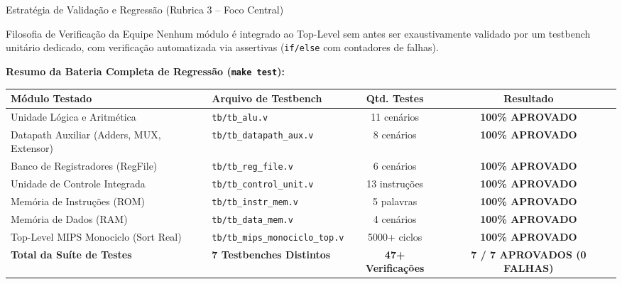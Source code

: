\documentclass[aspectratio=169, 11pt]{beamer}
\begin{document}
\begin{frame}{Estratégia de Validação e Regressão (Rubrica 3 -- Foco Central)}
  \begin{block}{Filosofia de Verificação da Equipe}
    Nenhum módulo é integrado ao Top-Level sem antes ser exaustivamente validado por um testbench unitário dedicado, com verificação automatizada via assertivas (\texttt{if/else} com contadores de falhas).
  \end{block}

  \vspace{0.3cm}
  \textbf{Resumo da Bateria Completa de Regressão (\texttt{make test}):}
  \vspace{0.2cm}
  \centering
  \small
  \begin{tabular}{llcc}
    \toprule
    \textbf{Módulo Testado} & \textbf{Arquivo de Testbench} & \textbf{Qtd. Testes} & \textbf{Resultado} \\
    \midrule
    Unidade Lógica e Aritmética & \texttt{tb/tb\_alu.v} & 11 cenários & \textcolor{passgreen}{\textbf{100\% APROVADO}} \\
    Datapath Auxiliar (Adders, MUX, Extensor) & \texttt{tb/tb\_datapath\_aux.v} & 8 cenários & \textcolor{passgreen}{\textbf{100\% APROVADO}} \\
    Banco de Registradores (RegFile) & \texttt{tb/tb\_reg\_file.v} & 6 cenários & \textcolor{passgreen}{\textbf{100\% APROVADO}} \\
    Unidade de Controle Integrada & \texttt{tb/tb\_control\_unit.v} & 13 instruções & \textcolor{passgreen}{\textbf{100\% APROVADO}} \\
    Memória de Instruções (ROM) & \texttt{tb/tb\_instr\_mem.v} & 5 palavras & \textcolor{passgreen}{\textbf{100\% APROVADO}} \\
    Memória de Dados (RAM) & \texttt{tb/tb\_data\_mem.v} & 4 cenários & \textcolor{passgreen}{\textbf{100\% APROVADO}} \\
    Top-Level MIPS Monociclo (Sort Real) & \texttt{tb/tb\_mips\_monociclo\_top.v} & 5000+ ciclos & \textcolor{passgreen}{\textbf{100\% APROVADO}} \\
    \midrule
    \textbf{Total da Suíte de Testes} & \textbf{7 Testbenches Distintos} & \textbf{47+ Verificações} & \textcolor{passgreen}{\textbf{7 / 7 APROVADOS (0 FALHAS)}} \\
    \bottomrule
  \end{tabular}
\end{frame}
\end{document}
